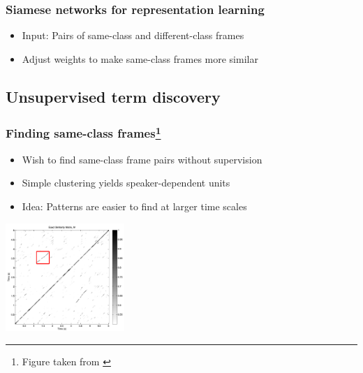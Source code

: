 \documentclass[british]{beamer}
\begin{document}
  \begin{frame}
    \frametitle{Siamese networks for representation learning}
    
    \begin{itemize}
     \item Input: Pairs of same-class and different-class frames
     \item Adjust weights to make same-class frames more similar
    \end{itemize}

    \centering
    
  \end{frame}

  \subsection{Unsupervised term discovery}
  
  \begin{frame}
    \frametitle{Finding same-class frames\footnote{Figure taken from \textcite{jansen2011efficient}}}
    
    \begin{itemize}
     \item Wish to find same-class frame pairs without supervision
     \item Simple clustering yields speaker-dependent units
     \item Idea: Patterns are easier to find at larger time scales
    \end{itemize}
    
    \centering
    \includegraphics[width=4.5cm]{figures/similarity-matrix.png}

  \end{frame}
  
\end{document}
